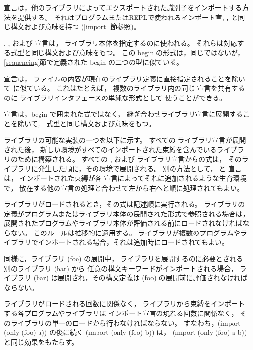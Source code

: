  宣言は，他のライブラリによってエクスポートされた識別子をインポートする方法を提供する。
それはプログラムまたはREPLで使われるインポート宣言
と同じ構文および意味を持つ (\ref{import} 節参照)。

, , および  宣言は，
ライブラリ本体を指定するのに使われる。
それらは対応する式型と同じ構文および意味をもつ。
この {\cf begin} の形式は，同じではないが，\ref{sequencing}節で定義された
{\cf begin} の二つの型に似ている。

 宣言は，
ファイルの内容が現在のライブラリ定義に直接指定されることを除いて
 に似ている。
これはたとえば，
複数のライブラリ内の同じ  宣言を共有するのに
ライブラリインタフェースの単純な形式として
使うことができる。

 宣言は，{\cf begin} で囲まれた式ではなく，
継ぎ合わせライブラリ宣言に展開することを除いて，
 式型と同じ構文および意味をもつ。


ライブラリの可能な実装の一つを以下に示す。
すべての  ライブラリ宣言が展開された後，
新しい環境がすべてのインポートされた束縛を含んでいるライブラリのために構築される。
すべての ,  および  ライブラリ宣言からの式は，
そのライブラリに発生した順に，その環境で展開される。
別の方法として， と  宣言は，
インポートされた束縛が各  宣言によってそれに追加されるような生育環境で，
散在する他の宣言の処理と合わせて左から右へと順に処理されてもよい。

ライブラリがロードされるとき，その式は記述順に実行される。
ライブラリの定義がプログラムまたはライブラリ本体の展開された形式で参照される場合は，
展開されたプログラムやライブラリ本体が評価される前にロードされなければならない。
このルールは推移的に適用する。
ライブラリが複数のプログラムやライブラリでインポートされる場合，それは追加時にロードされてもよい。

同様に，ライブラリ {\cf (foo)} の展開中，
ライブラリを展開するのに必要とされる別のライブラリ {\cf (bar)} から
任意の構文キーワードがインポートされる場合，
ライブラリ {\cf (bar)} は展開され，その構文定義は {\cf (foo)} の展開前に評価されなければならない。

ライブラリがロードされる回数に関係なく，
ライブラリから束縛をインポートする各プログラムやライブラリは
インポート宣言の現れる回数に関係なく，
そのライブラリの単一のロードから行わなければならない。
すなわち，{\cf (import (only (foo) a))} の後に続く {\cf (import (only (foo) b))}
は， {\cf (import (only (foo) a b))} と同じ効果をもたらす。

